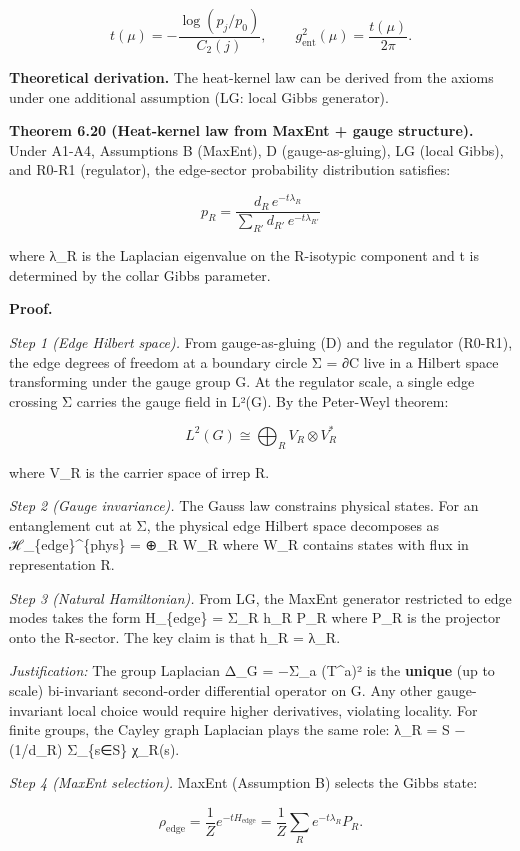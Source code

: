 \documentclass[
]{article}
\begin{document}
\[
t(\mu) = -\frac{\log(p_j/p_0)}{C_2(j)}, \qquad
g_{\mathrm{ent}}^2(\mu) = \frac{t(\mu)}{2\pi}.
\]

\textbf{Theoretical derivation.} The heat-kernel law can be derived from
the axioms under one additional assumption (LG: local Gibbs generator).

\textbf{Theorem 6.20 (Heat-kernel law from MaxEnt + gauge structure).}
Under A1-A4, Assumptions B (MaxEnt), D (gauge-as-gluing), LG (local
Gibbs), and R0-R1 (regulator), the edge-sector probability distribution
satisfies:

\[
p_R = \frac{d_R \, e^{-t \lambda_R}}{\sum_{R'} d_{R'} \, e^{-t \lambda_{R'}}}
\]

where λ\_R is the Laplacian eigenvalue on the R-isotypic component and t
is determined by the collar Gibbs parameter.

\textbf{Proof.}

\emph{Step 1 (Edge Hilbert space).} From gauge-as-gluing (D) and the
regulator (R0-R1), the edge degrees of freedom at a boundary circle Σ =
∂C live in a Hilbert space transforming under the gauge group G. At the
regulator scale, a single edge crossing Σ carries the gauge field in
L²(G). By the Peter-Weyl theorem:

\[
L^2(G) \cong \bigoplus_R V_R \otimes V_R^*
\]

where V\_R is the carrier space of irrep R.

\emph{Step 2 (Gauge invariance).} The Gauss law constrains physical
states. For an entanglement cut at Σ, the physical edge Hilbert space
decomposes as ℋ\_\{edge\}\^{}\{phys\} = ⊕\_R W\_R where W\_R contains
states with flux in representation R.

\emph{Step 3 (Natural Hamiltonian).} From LG, the MaxEnt generator
restricted to edge modes takes the form H\_\{edge\} = Σ\_R h\_R P\_R
where P\_R is the projector onto the R-sector. The key claim is that
h\_R = λ\_R.

\emph{Justification:} The group Laplacian Δ\_G = −Σ\_a (T\^{}a)² is the
\textbf{unique} (up to scale) bi-invariant second-order differential
operator on G. Any other gauge-invariant local choice would require
higher derivatives, violating locality. For finite groups, the Cayley
graph Laplacian plays the same role: λ\_R = \textbar S\textbar{} −
(1/d\_R) Σ\_\{s∈S\} χ\_R(s).

\emph{Step 4 (MaxEnt selection).} MaxEnt (Assumption B) selects the
Gibbs state:

\[
\rho_{\mathrm{edge}} = \frac{1}{Z} e^{-t H_{\mathrm{edge}}} = \frac{1}{Z}
\sum_R e^{-t \lambda_R} P_R.
\]
\end{document}
